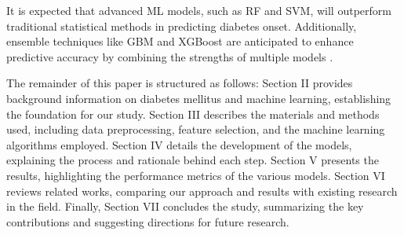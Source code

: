 It is expected that advanced ML models, such as RF and SVM, will outperform traditional statistical methods in predicting diabetes onset. Additionally, ensemble techniques like GBM and XGBoost are anticipated to enhance predictive accuracy by combining the strengths of multiple models \cite{Ref5}.

The remainder of this paper is structured as follows: Section II provides background information on diabetes mellitus and machine learning, establishing the foundation for our study. Section III describes the materials and methods used, including data preprocessing, feature selection, and the machine learning algorithms employed. Section IV details the development of the models, explaining the process and rationale behind each step. Section V presents the results, highlighting the performance metrics of the various models. Section VI reviews related works, comparing our approach and results with existing research in the field. Finally, Section VII concludes the study, summarizing the key contributions and suggesting directions for future research.